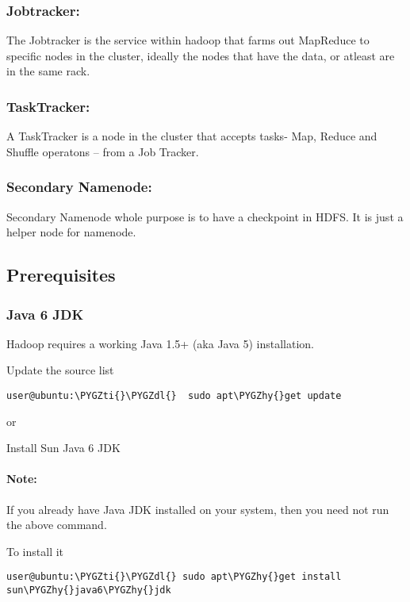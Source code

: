 \documentclass[letterpaper,10pt,english]{sphinxmanual}
\def\PYGZdl{\char`\$}
\def\PYGZhy{\char`\-}
\def\PYGZti{\char`\~}
\begin{document}
\subsubsection{Jobtracker:}
\label{hadoop:jobtracker}
The Jobtracker is the service within hadoop that farms out MapReduce to specific nodes in the cluster, ideally the nodes that have the data, or atleast are in the same rack.


\subsubsection{TaskTracker:}
\label{hadoop:tasktracker}
A TaskTracker is a node in the cluster that accepts tasks- Map, Reduce and Shuffle operatons – from a Job Tracker.


\subsubsection{Secondary Namenode:}
\label{hadoop:secondary-namenode}
Secondary Namenode whole purpose is to have a checkpoint in HDFS. It is just a helper node for namenode.


\subsection{Prerequisites}
\label{hadoop:prerequisites}

\subsubsection{Java 6 JDK}
\label{hadoop:java-6-jdk}
Hadoop requires a working Java 1.5+ (aka Java 5) installation.

Update the source list

\begin{Verbatim}[commandchars=\\\{\}]
user@ubuntu:\PYGZti{}\PYGZdl{}  sudo apt\PYGZhy{}get update
\end{Verbatim}

or

Install Sun Java 6 JDK


\paragraph{Note:}
\label{hadoop:note}
If you already have Java JDK installed on your system, then you need not run the above command.

To install it

\begin{Verbatim}[commandchars=\\\{\}]
user@ubuntu:\PYGZti{}\PYGZdl{} sudo apt\PYGZhy{}get install sun\PYGZhy{}java6\PYGZhy{}jdk
\end{Verbatim}
\end{document}
